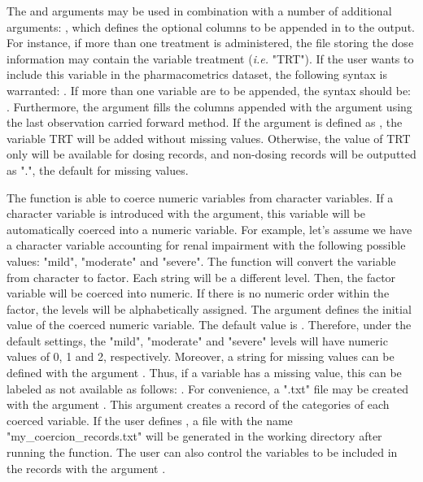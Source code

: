 The  and  arguments may be used in combination with a number of additional arguments: , which defines the optional columns to be appended in to the output. For instance, if more than one treatment is administered, the file storing the dose information may contain the variable treatment (\textit{i.e.} "TRT"). If the user wants to include this variable in the pharmacometrics dataset, the following syntax is warranted:  . If more than one variable are to be appended, the syntax should be:  .
Furthermore, the argument  fills the columns appended with the argument  using the last observation carried forward method. If the argument is defined as , the variable TRT will be added without missing values. Otherwise, the value of TRT only will be available for dosing records, and non-dosing records will be outputted as ".", the default for missing values. 

The  function is able to coerce numeric variables from character variables. If a character variable is introduced with the  argument, this variable will be automatically coerced into a numeric variable. For example, let’s assume we have a character variable accounting for renal impairment with the following possible values: "mild", "moderate" and "severe". The  function will convert the variable from character to factor. Each string will be a different level. Then, the factor variable will be coerced into numeric. If there is no numeric order within the factor, the levels will be alphabetically assigned. The argument  defines the initial value of the coerced numeric variable. The default value is . Therefore, under the default settings, the "mild", "moderate" and "severe" levels will have numeric values of 0, 1 and 2, respectively. Moreover, a string for missing values can be defined with the argument . Thus, if a variable has a missing value, this can be labeled as not available as follows: .  For convenience, a ".txt" file may be created with the argument . This argument creates a record of the categories of each coerced variable. If the user defines , a file with the name "my\_coercion\_records.txt" will be generated in the working directory after running the  function. The user can also control the variables to be included in the records with the argument . 

